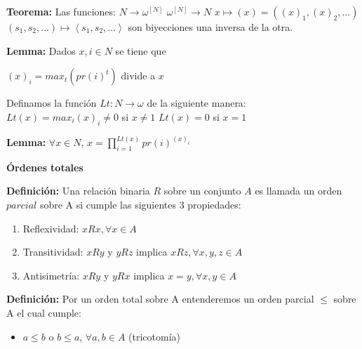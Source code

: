 \documentclass{article}
\begin{document}
\begin{flushleft}
\textbf{Teorema:} Las funciones:\linebreak
\hspace*{10ex}$N \rightarrow \omega^{[N]}$ \hspace*{30ex} $\omega^{[N]} \rightarrow N$\linebreak
\hspace*{10ex} $x \mapsto (x) = ((x)_1, (x)_2, ...)$ \hspace*{8ex} $(s_1, s_2, ...) \mapsto \left\langle s_1, s_2, ... \right\rangle$\linebreak
son biyecciones una inversa de la otra.\linebreak

\textbf{Lemma:} Dados $x, i \in N$ se tiene que
\begin{center}
    $(x)_i = max_t(pr(i)^t)$ divide a $x$
\end{center}

Definamos la función $Lt: N \rightarrow \omega$ de la siguiente manera:
\hspace*{20ex}$Lt(x) = max_i(x)_i \neq 0$ si $x \neq 1$\linebreak
\hspace*{20ex}$Lt(x) = 0$ si $x = 1$\linebreak

\textbf{Lemma:} $\forall x \in N$, $x = \prod_{i=1}^{Lt(x)} pr(i)^{(x)_i}$\linebreak

\begin{Large}\textbf{Órdenes totales}\end{Large}\linebreak

\textbf{Definición:} Una relación binaria $R$ sobre un conjunto $A$ es llamada un orden $parcial$ sobre A si cumple las siguientes 3 propiedades:
\begin{enumerate}
    \item Reflexividad: $xRx, \forall x \in A$
    \item Transitividad: $xRy$ y $yRz$ implica $xRz, \forall x, y, z \in A$
    \item Antisimetría: $xRy$ y $yRx$ implica $x = y, \forall x, y \in A$
\end{enumerate}

\textbf{Definición:} Por un orden total sobre A entenderemos un orden parcial $\leq$ sobre A el cual cumple:
\begin{itemize}
    \item $a \leq b$ o $b \leq a$, $\forall a, b \in A$ (tricotomía)\linebreak
\end{itemize}


\end{flushleft}
\end{document}
